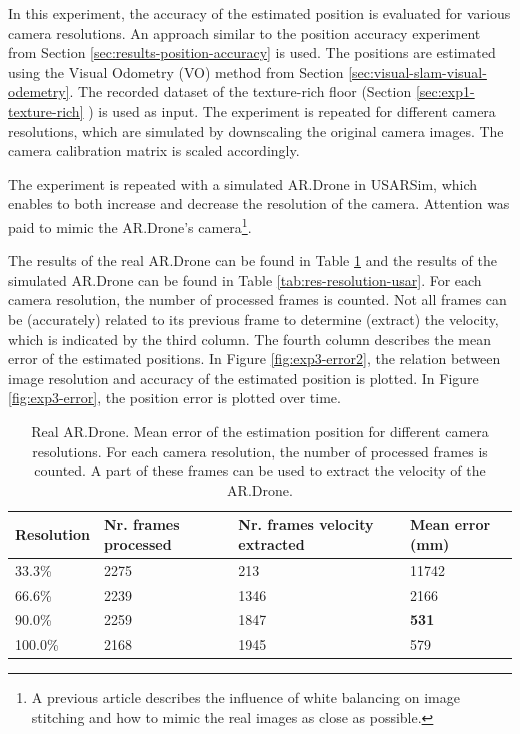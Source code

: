 In this experiment, the accuracy of the estimated position is evaluated for various camera resolutions.
An approach similar to the position accuracy experiment from Section \ref{sec:results-position-accuracy} is used.
The positions are estimated using the Visual Odometry (VO) method from Section \ref{sec:visual-slam-visual-odemetry}.
The recorded dataset of the texture-rich floor (Section \ref{sec:exp1-texture-rich} ) is used as input.
The experiment is repeated for different camera resolutions, which are simulated by downscaling the original camera images.
The camera calibration matrix is scaled accordingly.

The experiment is repeated with a simulated AR.Drone in USARSim, which enables to both increase and decrease the resolution of the camera.
Attention was paid to mimic the AR.Drone's camera\footnote{A previous article \cite{Visser2011imav} describes the influence of white balancing on image stitching and how to mimic the real images as close as possible.}.

The results of the real AR.Drone can be found in Table \ref{tab:res-resolution-ar} and the results of the simulated AR.Drone can be found in Table \ref{tab:res-resolution-usar}.
For each camera resolution, the number of processed frames is counted.
Not all frames can be (accurately) related to its previous frame to determine (extract) the velocity, which is indicated by the third column.
The fourth column describes the mean error of the estimated positions.
In Figure \ref{fig:exp3-error2}, the relation between image resolution and accuracy of the estimated position is plotted.
In Figure \ref{fig:exp3-error}, the position error is plotted over time.


\begin{table}[htb!]
    \centering
    \begin{tabular}
        { | l | l | l | l | } 
	\hline
	Resolution & Nr. frames processed & Nr. frames velocity extracted & Mean error (mm) \\
        \hline
        33.3\% & 2275 & 213 & 11742 \\
	66.6\% & 2239 & 1346 & 2166 \\
	90.0\% & 2259 & 1847 & \textbf{531} \\
	100.0\% & 2168 & 1945 & 579 \\
	\hline
    \end{tabular}
    \caption{Real AR.Drone. Mean error of the estimation position for different camera resolutions. For each camera resolution, the number of processed frames is counted. A part of these frames can be used to extract the velocity of the AR.Drone.}
    \label{tab:res-resolution-ar}
\end{table}

